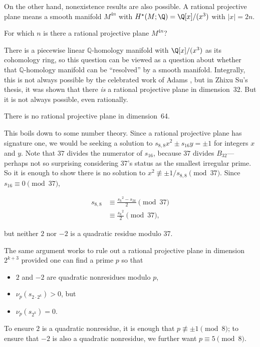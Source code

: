   On the other hand, nonexistence results are also possible. A rational projective plane means a smooth manifold $M^{4n}$ with $H^\star(M;\Q) = \Q[x]/(x^3)$ with $|x| = 2n$.
  \begin{question}
  For which $n$ is there a rational projective plane $M^{4n}$?
  \end{question}
  There is a piecewise linear $\mathbb{Q}$-homology manifold with $\Q[x]/(x^3)$ as its cohomology ring, so this question can be viewed as a question about whether that $\mathbb{Q}$-homology manifold can be ``resolved'' by a smooth manifold.  Integrally, this is not always possible by the celebrated work of Adams \cite{MR133837}, but in Zhixu Su's thesis, it was shown that there \textit{is} a rational projective plane in dimension~32.  But it is not always possible, even rationally.
  \begin{theorem}[Fowler--Su]
    There is no rational projective plane in dimension~64.
  \end{theorem}
  This boils down to some number theory.  Since a rational projective plane has signature one, we would be seeking a solution to $s_{8,8} x^2 \pm s_{16} y = \pm 1$ for integers $x$ and $y$.  Note that $37$ divides the numerator of $s_{16}$, because $37$ divides $B_{32}$---perhaps not so surprising considering 37's status as the smallest irregular prime.  So it is enough to show there is no solution to $x^2 \not\equiv \pm 1/s_{8,8} \pmod{37}$.  Since $s_{16} \equiv 0 \pmod{37}$,
  
\begin{align*}
  s_{8,8}
  &\equiv \frac{ {s_k}^2 - s_{2k}}{2} \pmod{37} \\
  &\equiv \frac{ {s_k}^2}{2} \pmod{37},
\end{align*}
  
but neither $2$ nor $-2$ is a quadratic residue modulo 37.

The same argument works to rule out a rational projective plane in
dimension $2^{k+3}$ provided one can find a prime $p$ so that
\begin{itemize}
  \item $2$ and $-2$ are quadratic nonresidues modulo $p$,
  \item $\nu_p(s_{2 \cdot 2^k}) > 0$, but
  \item $\nu_p(s_{2^k}) = 0$.
\end{itemize}
To ensure $2$ is a quadratic nonresidue, it is enough that $p \not\equiv \pm 1 \pmod 8$; to ensure that $-2$ is also a quadratic nonresidue, we further want $p \equiv 5 \pmod 8$.

